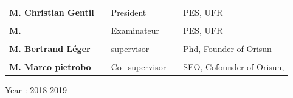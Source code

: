 \begin{titlepage}
\begin{center}
\vfill


\end{center}

\begin{table}[h!]
\centering
  \begin{tabular}{lllll}
\bf{M. Christian Gentil}   & & President & & PES, UFR \\
           & &  & & \\
 \bf{M.  }            & & Examinateur & & PES, UFR \\
             & &  & &  \\
 
 \bf{M. Bertrand Léger }   & & supervisor & & Phd, Founder of Orisun\\
           & &  & & \\
\bf{M. Marco pietrobo }   & & Co$-$supervisor & & SEO, Cofounder of Orisun,
\end{tabular}
\end{table}

\large{


\vspace{0.7cm}

\begin{center}
	Year : 2018-2019
\end{center}
}

\end{titlepage}